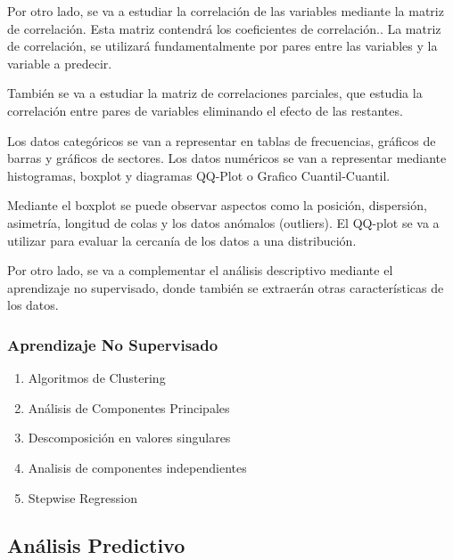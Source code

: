 \documentclass[spanish,12pt, a4paper,twoside]{paper}
\begin{document}
Por otro lado, se va a estudiar la correlación de las variables mediante la matriz de correlación. Esta matriz contendrá los coeficientes de correlación.\cite{JMMarin}. La matriz de correlación, se utilizará fundamentalmente por pares entre las variables y la variable a predecir.

También se va a estudiar la matriz de correlaciones parciales, que estudia la correlación entre pares de variables eliminando el efecto de las restantes.\cite{JMMarin}

Los datos categóricos se van a representar en tablas de frecuencias, gráficos de barras y gráficos de sectores. Los datos numéricos se van a representar mediante histogramas, boxplot y diagramas QQ-Plot o Grafico Cuantil-Cuantil. \cite{Orellana2001}

Mediante el boxplot se puede observar aspectos como la posición, dispersión, asimetría, longitud de colas y los datos anómalos (outliers). 
El QQ-plot se va a utilizar para evaluar la cercanía de los datos a una distribución. \cite{Orellana2001}

Por otro lado, se va a complementar el análisis descriptivo mediante el aprendizaje no supervisado, donde también se extraerán otras características de los datos.


\subsubsection{Aprendizaje No Supervisado}
\begin{enumerate}
\item Algoritmos de Clustering
\item Análisis de Componentes Principales
\item Descomposición en valores singulares
\item Analisis de componentes independientes
\item Stepwise Regression
\end{enumerate}


\subsection{Análisis Predictivo}
\end{document}

